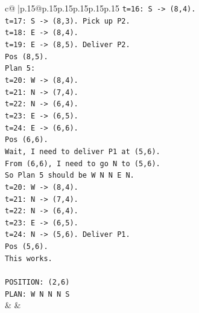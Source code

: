 \documentclass{article}
\begin{document}
{\begin{supertabular}{c@{$\;$}|p{.15\linewidth}@{}p{.15\linewidth}p{.15\linewidth}p{.15\linewidth}p{.15\linewidth}p{.15\linewidth}}
{{{\texttt{t=16: S {-}> (8,4).} \\
\texttt{t=17: S {-}> (8,3). Pick up P2.} \\
\texttt{t=18: E {-}> (8,4).} \\
\texttt{t=19: E {-}> (8,5). Deliver P2.} \\
\texttt{Pos (8,5).} \\
\texttt{Plan 5:} \\
\texttt{t=20: W {-}> (8,4).} \\
\texttt{t=21: N {-}> (7,4).} \\
\texttt{t=22: N {-}> (6,4).} \\
\texttt{t=23: E {-}> (6,5).} \\
\texttt{t=24: E {-}> (6,6).} \\
\texttt{Pos (6,6).} \\
\texttt{Wait, I need to deliver P1 at (5,6).} \\
\texttt{From (6,6), I need to go N to (5,6).} \\
\texttt{So Plan 5 should be W N N E N.} \\
\texttt{t=20: W {-}> (8,4).} \\
\texttt{t=21: N {-}> (7,4).} \\
\texttt{t=22: N {-}> (6,4).} \\
\texttt{t=23: E {-}> (6,5).} \\
\texttt{t=24: N {-}> (5,6). Deliver P1.} \\
\texttt{Pos (5,6).} \\
\texttt{This works.} \\
\\ 
\texttt{POSITION: (2,6)} \\
\texttt{PLAN: W N N N S} \\
            }
        }
    }
    & & \\ \\


\end{supertabular}}
\end{document}
